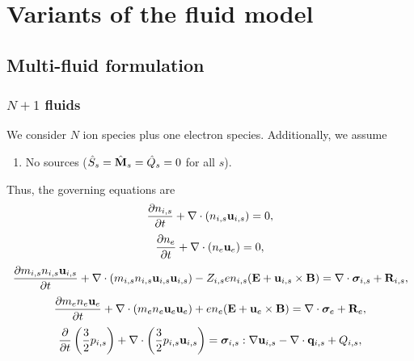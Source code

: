 \documentclass[a4paper,11pt]{report}
\begin{document}
\chapter{Variants of the fluid model}

\section{Multi-fluid formulation}
\subsection{$N+1$ fluids}
\label{sec:mf_np1fluid_equations}
We consider $N$ ion species plus one electron species. Additionally, we assume 
\begin{enumerate}
    \item No sources ($\hat{S}_s = \hat{\mathbf{M}}_s = \hat{Q}_s = 0$ for all $s$).
\end{enumerate}
Thus, the governing equations are
\begin{equation}
    \label{eq:mf_np1fluid_ni}
    \frac{\partial n_{i,s}}{\partial t} + \nabla \cdot \left ( n_{i,s} \mathbf{u}_{i,s} \right ) = 0,
\end{equation}
\begin{equation}
    \label{eq:mf_np1fluid_ne}
    \frac{\partial n_e}{\partial t} + \nabla \cdot \left ( n_e \mathbf{u}_e \right ) = 0,
\end{equation}
\begin{equation}
    \label{eq:mf_np1fluid_ui}
    \frac{\partial m_{i,s} n_{i,s} \mathbf{u}_{i,s}}{\partial t} + \nabla \cdot \left( m_{i,s} n_{i,s} \mathbf{u}_{i,s} \mathbf{u}_{i,s} \right) - Z_{i,s} e n_{i,s} ( \mathbf{E} + \mathbf{u}_{i,s} \times \mathbf{B} ) = \nabla \cdot \bm \sigma_{i,s} + \mathbf{R}_{i,s},
\end{equation}
\begin{equation}
    \label{eq:mf_np1fluid_ue}
    \frac{\partial m_e n_e \mathbf{u}_e}{\partial t} + \nabla \cdot \left ( m_e n_e \mathbf{u}_e \mathbf{u}_e \right) + e n_e ( \mathbf{E} + \mathbf{u}_e \times \mathbf{B} ) = \nabla \cdot \bm \sigma_e + \mathbf{R}_e,
\end{equation}
\begin{equation}
    \label{eq:mf_np1fluid_iei}
    \frac{\partial}{\partial t} \left ( \frac{3}{2} p_{i,s} \right ) + \nabla \cdot \left ( \frac{3}{2} p_{i,s} \mathbf{u}_{i,s} \right ) = \bm \sigma_{i,s} : \nabla \mathbf{u}_{i,s} - \nabla \cdot \mathbf{q}_{i,s} + Q_{i,s},
\end{equation}
\end{document}
